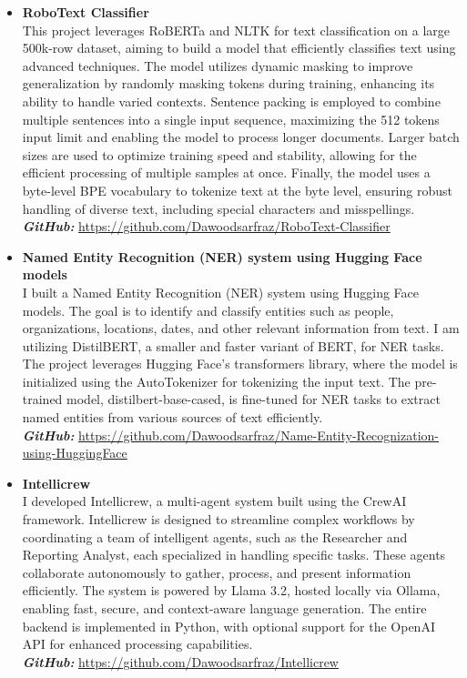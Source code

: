 \documentclass[a4paper,12pt]{article}
\begin{document}
\begin{itemize}
\item \textbf{RoboText Classifier} \\
This project leverages RoBERTa and NLTK for text classification on a large 500k-row dataset, aiming to build a model that efficiently classifies text using advanced techniques. The model utilizes dynamic masking to improve generalization by randomly masking tokens during training, enhancing its ability to handle varied contexts. Sentence packing is employed to combine multiple sentences into a single input sequence, maximizing the 512 tokens input limit and enabling the model to process longer documents. Larger batch sizes are used to optimize training speed and stability, allowing for the efficient processing of multiple samples at once. Finally, the model uses a byte-level BPE vocabulary to tokenize text at the byte level, ensuring robust handling of diverse text, including special characters and misspellings. \\
\textbf{\textit{GitHub:}} \href{https://github.com/Dawoodsarfraz/RoboText-Classifier}{https://github.com/Dawoodsarfraz/RoboText-Classifier}

	
\item \textbf{Named Entity Recognition (NER) system using Hugging Face models} \\
I built a Named Entity Recognition (NER) system using Hugging Face models. The goal is to identify and classify entities such as people, organizations, locations, dates, and other relevant information from text. I am utilizing DistilBERT, a smaller and faster variant of BERT, for NER tasks. The project leverages Hugging Face's transformers library, where the model is initialized using the AutoTokenizer for tokenizing the input text. The pre-trained model, distilbert-base-cased, is fine-tuned for NER tasks to extract named entities from various sources of text efficiently. \\
\textbf{\textit{GitHub:}} \url{https://github.com/Dawoodsarfraz/Name-Entity-Recognization-using-HuggingFace}

	
\item \textbf{Intellicrew} \\
I developed Intellicrew, a multi-agent system built using the CrewAI framework. Intellicrew is designed to streamline complex workflows by coordinating a team of intelligent agents, such as the Researcher and Reporting Analyst, each specialized in handling specific tasks. These agents collaborate autonomously to gather, process, and present information efficiently. The system is powered by Llama 3.2, hosted locally via Ollama, enabling fast, secure, and context-aware language generation. The entire backend is implemented in Python, with optional support for the OpenAI API for enhanced processing capabilities. \\
\textbf{\textit{GitHub:}} \href{https://github.com/Dawoodsarfraz/Intellicrew}{https://github.com/Dawoodsarfraz/Intellicrew}
	

\end{itemize}
\end{document}
